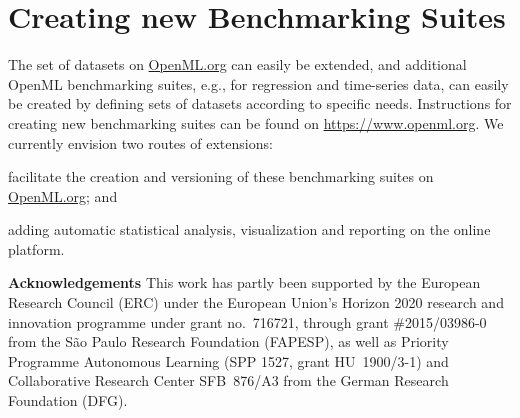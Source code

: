 \documentclass[twoside,11pt]{article}
\begin{document}
\section{Creating new Benchmarking Suites}

The set of datasets on \url{OpenML.org} can easily be extended, and additional OpenML benchmarking suites, e.g., for regression and time-series data, can easily be created by defining sets of datasets according to specific needs. Instructions for creating new benchmarking suites can be found on \url{https://www.openml.org}. We currently envision two routes of extensions:
\begin{enumerate*}[(a)]
\item facilitate the creation and versioning of these benchmarking suites on \url{OpenML.org}; and 
\item adding automatic statistical analysis, visualization and reporting on the online platform.
\end{enumerate*}


\noindent \textbf{Acknowledgements} This work has partly been supported by the European Research Council (ERC) under the European Union's Horizon 2020 research and innovation programme under grant no.\ 716721, through grant \#2015/03986-0 from the S{\~a}o Paulo Research Foundation (FAPESP), as well as Priority Programme Autonomous Learning (SPP 1527, grant HU~1900/3-1) and Collaborative Research Center SFB~876/A3 from the German Research Foundation (DFG).

\clearpage


\begin{footnotesize}

\end{footnotesize}


\appendix
\end{document}
